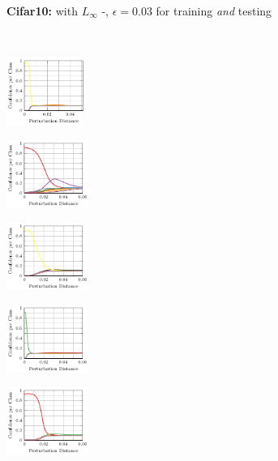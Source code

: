 \begin{figure}[t]
\begin{subfigure}{1\textwidth}
        \centering
        \textbf{Cifar10:} \textbf{\ConfTrain} with $L_\infty$ \PGD-\FConf, $\epsilon = 0.03$ for training \emph{and} testing
    \end{subfigure}
    \\[2px]
    \begin{subfigure}{0.19\textwidth}
        \includegraphics[height=2.2cm]{fig_cifar10_ours10_5_adversarial}
    \end{subfigure}
    \begin{subfigure}{0.19\textwidth}
        \includegraphics[height=2.2cm]{fig_cifar10_ours10_6_adversarial}
    \end{subfigure}
    \begin{subfigure}{0.19\textwidth}
        \includegraphics[height=2.2cm]{fig_cifar10_ours10_7_adversarial}
    \end{subfigure}
    \begin{subfigure}{0.19\textwidth}
        \includegraphics[height=2.2cm]{fig_cifar10_ours10_8_adversarial}
    \end{subfigure}
    \begin{subfigure}{0.19\textwidth}
        \includegraphics[height=2.2cm]{fig_cifar10_ours10_9_adversarial}
    \end{subfigure}

\end{figure}
